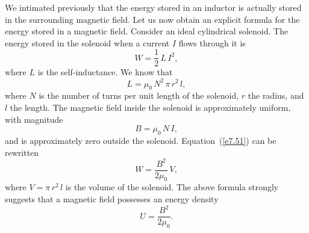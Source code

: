 We intimated previously that the energy stored in an inductor is actually
stored in the surrounding  magnetic field. Let us now obtain an
explicit formula for the energy stored in a magnetic field. Consider an ideal
cylindrical solenoid. The energy stored in the solenoid when a current $I$ flows through it
is
\begin{equation}\label{e7.51}
W = \frac{1}{2} \,L \,I^2,
\end{equation}
where $L$ is the self-inductance. We know that
\begin{equation}
L = \mu_0\, N^2\,\pi\, r^2\, l,
\end{equation}
where $N$ is the number of turns per unit length of the
solenoid, $r$ the radius, and $l$ the length. The magnetic field inside the solenoid is approximately
uniform, with magnitude
\begin{equation}
B = \mu_0 \,N\,I,
\end{equation}
and is approximately zero outside the solenoid. Equation~(\ref{e7.51}) can be rewritten 
\begin{equation}
W = \frac{B^2}{2\mu_0}\,V,
\end{equation}
where $V = \pi\, r^2 \,l$ is the volume of the solenoid. The above formula strongly
suggests that a magnetic field possesses an energy density
\begin{equation}\label{eeb}
U = \frac{B^2}{2\mu_0}.
\end{equation}

